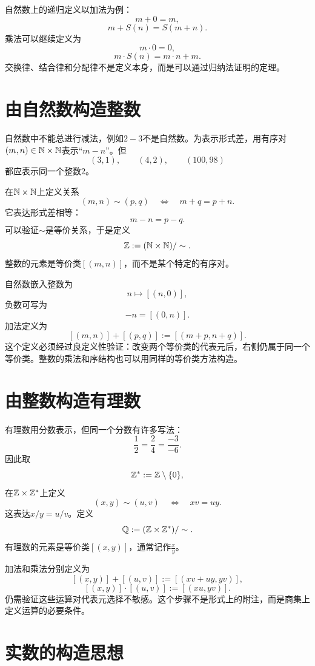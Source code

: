 自然数上的递归定义以加法为例：
\[
    m+0=m,
\]
\[
    m+S(n)=S(m+n).
\]
乘法可以继续定义为
\[
    m\cdot0=0,
\]
\[
    m\cdot S(n)=m\cdot n+m.
\]
交换律、结合律和分配律不是定义本身，而是可以通过归纳法证明的定理。


\section{由自然数构造整数}

自然数中不能总进行减法，例如$2-3$不是自然数。为表示形式差，用有序对$(m,n)\in\mathbb{N}\times\mathbb{N}$表示“$m-n$”。但
\[
    (3,1),\qquad(4,2),\qquad(100,98)
\]
都应表示同一个整数$2$。

在$\mathbb{N}\times\mathbb{N}$上定义关系
\[
    (m,n)\sim(p,q)
    \quad\Longleftrightarrow\quad
    m+q=p+n.
\]
它表达形式差相等：
\[
    m-n=p-q.
\]
可以验证$\sim$是等价关系，于是定义
\[
    \mathbb{Z}:=(\mathbb{N}\times\mathbb{N})/\sim.
\]
整数的元素是等价类$[(m,n)]$，而不是某个特定的有序对。

自然数嵌入整数为
\[
    n\longmapsto[(n,0)],
\]
负数可写为
\[
    -n=[(0,n)].
\]
加法定义为
\[
    [(m,n)]+[(p,q)]
    :=[(m+p,n+q)].
\]
这个定义必须经过良定义性验证：改变两个等价类的代表元后，右侧仍属于同一个等价类。整数的乘法和序结构也可以用同样的等价类方法构造。


\section{由整数构造有理数}

有理数用分数表示，但同一个分数有许多写法：
\[
    \frac12=\frac24=\frac{-3}{-6}.
\]
因此取
\[
    \mathbb{Z}^*:=\mathbb{Z}\setminus\{0\},
\]
在$\mathbb{Z}\times\mathbb{Z}^*$上定义
\[
    (x,y)\sim(u,v)
    \quad\Longleftrightarrow\quad
    xv=uy.
\]
这表达$x/y=u/v$。定义
\[
    \mathbb{Q}:=(\mathbb{Z}\times\mathbb{Z}^*)/\sim.
\]
有理数的元素是等价类$[(x,y)]$，通常记作$\frac{x}{y}$。

加法和乘法分别定义为
\[
    [(x,y)]+[(u,v)]
    :=[(xv+uy,yv)],
\]
\[
    [(x,y)]\cdot[(u,v)]
    :=[(xu,yv)].
\]
仍需验证这些运算对代表元选择不敏感。这个步骤不是形式上的附注，而是商集上定义运算的必要条件。


\section{实数的构造思想}

